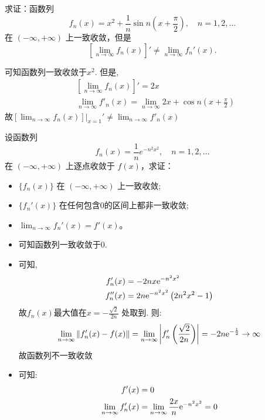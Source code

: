 \begin{problem}
    求证：函数列
    \[
        f_n(x) = x^2 + \frac{1}{n} \sin n \left( x + \frac{\pi}{2}
        \right), \quad n = 1, 2, \dots
    \]
    在 \((-\infty, +\infty)\) 上一致收敛，但是
    \[
        \left[ \lim_{n \to \infty} f_n(x) \right]' \neq \lim_{n \to
        \infty} f_n'(x).
    \]
\end{problem}

\begin{solution}
    可知函数列一致收敛于\(x^{2}\).
    但是,
    \begin{align*}
        & \left[ \lim_{n \to \infty} f_{n}(x) \right]' = 2x        \\
        & \lim_{n \to \infty} f'_{n}(x) = \lim_{n \to \infty} 2x +
        \cos n \left( x + \frac{\pi}{2} \right)
    \end{align*}
    故\(\left.\left[ \lim_{n \to \infty} f_n(x) \right]\right|_{x=1}'
        \neq \lim_{n \to
    \infty} f'_{n}(x)\)
\end{solution}

\begin{problem}
    设函数列
    \[
        f_n(x) = \frac{1}{n} e^{-n^2 x^2}, \quad n = 1, 2, \dots
    \]
    在 \((-\infty, +\infty)\) 上逐点收敛于 \(f(x)\)，求证：
    \begin{itemize}
        \item \(\{f_n(x)\}\) 在 \((-\infty, +\infty)\) 上一致收敛;
        \item \(\{f_n'(x)\}\) 在任何包含0的区间上都非一致收敛;
        \item \(\lim_{n \to \infty} f_n'(x) = f'(x)\)。
    \end{itemize}
\end{problem}

\begin{solution}
    \begin{itemize}
        \item 可知函数列一致收敛于\(0\).
        \item 可知,
            \begin{align*}
                f_{n}'(x)  & = -2nx\mathrm{e}^{-n^{2}x^{2}}     \\
                f_{n}''(x) & = 2n\mathrm{e}^{-n^{2}x^{2}}\left(
                2n^{2}x^{2} - 1\right)
            \end{align*}
            故\(f_{n}(x)\)最大值在\(x = -\frac{\sqrt{2}}{2n}\) 处取到.
            则: \[
                \lim_{n \to \infty} \left\lVert f_{n}'(x) - f(x)
                \right\rVert = \lim_{n \to \infty} \left|
                f'_{n}\left(\frac{\sqrt{2}}{2n}\right) \right| =
                -2n\mathrm{e}^{-\frac{1}{2}} \to \infty
            \]
            故函数列不一致收敛
        \item 可知:
            \begin{align*}
                f'(x)                         & = 0
                \\
                \lim_{n \to \infty} f'_{n}(x) & = \lim_{n \to \infty}
                \frac{2x}{n}\mathrm{e}^{-n^{2}x^{2}} = 0
            \end{align*}
    \end{itemize}
\end{solution}
